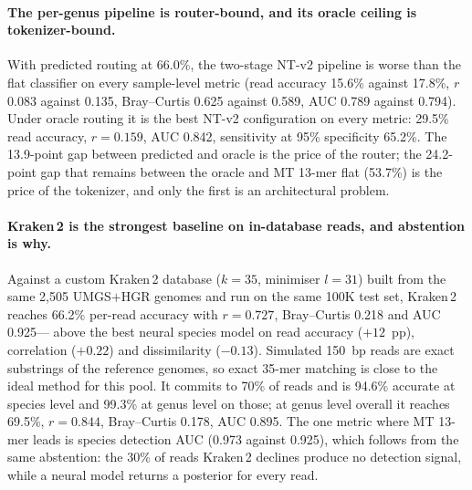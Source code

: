 \paragraph{The per-genus pipeline is router-bound, and its oracle ceiling is
tokenizer-bound.} With predicted routing at 66.0\%, the two-stage NT-v2 pipeline is
worse than the flat classifier on every sample-level metric (read accuracy 15.6\%
against 17.8\%, $r$ 0.083 against 0.135, Bray--Curtis 0.625 against 0.589, AUC 0.789
against 0.794). Under oracle routing it is the best NT-v2 configuration on every
metric: 29.5\% read accuracy, $r = 0.159$, AUC 0.842, sensitivity at 95\% specificity
65.2\%. The 13.9-point gap between predicted and oracle is the price of the router;
the 24.2-point gap that remains between the oracle and MT 13-mer flat (53.7\%) is the
price of the tokenizer, and only the first is an architectural problem.

\paragraph{Kraken\,2 is the strongest baseline on in-database reads, and abstention is
why.} Against a custom Kraken\,2 database ($k = 35$, minimiser $l = 31$) built from
the same 2{,}505 UMGS$+$HGR genomes and run on the same 100K test set, Kraken\,2
reaches 66.2\% per-read accuracy with $r = 0.727$, Bray--Curtis 0.218 and AUC 0.925---
above the best neural species model on read accuracy ($+12$~pp), correlation
($+0.22$) and dissimilarity ($-0.13$). Simulated 150~bp reads are exact substrings of
the reference genomes, so exact 35-mer matching is close to the ideal method for this
pool. It commits to 70\% of reads and is 94.6\% accurate at species level and 99.3\%
at genus level on those; at genus level overall it reaches 69.5\%, $r = 0.844$,
Bray--Curtis 0.178, AUC 0.895. The one metric where MT 13-mer leads is species
detection AUC (0.973 against 0.925), which follows from the same abstention: the 30\%
of reads Kraken\,2 declines produce no detection signal, while a neural model returns
a posterior for every read.

